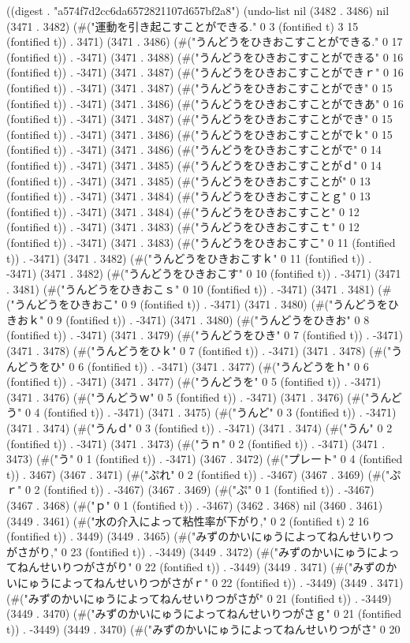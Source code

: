 
((digest . "a574f7d2cc6da6572821107d657bf2a8") (undo-list nil (3482 . 3486) nil (3471 . 3482) (#("運動を引き起こすことができる." 0 3 (fontified t) 3 15 (fontified t)) . 3471) (3471 . 3486) (#("うんどうをひきおこすことができる." 0 17 (fontified t)) . -3471) (3471 . 3488) (#("うんどうをひきおこすことができる" 0 16 (fontified t)) . -3471) (3471 . 3487) (#("うんどうをひきおこすことができｒ" 0 16 (fontified t)) . -3471) (3471 . 3487) (#("うんどうをひきおこすことができ" 0 15 (fontified t)) . -3471) (3471 . 3486) (#("うんどうをひきおこすことができあ" 0 16 (fontified t)) . -3471) (3471 . 3487) (#("うんどうをひきおこすことができ" 0 15 (fontified t)) . -3471) (3471 . 3486) (#("うんどうをひきおこすことがでｋ" 0 15 (fontified t)) . -3471) (3471 . 3486) (#("うんどうをひきおこすことがで" 0 14 (fontified t)) . -3471) (3471 . 3485) (#("うんどうをひきおこすことがｄ" 0 14 (fontified t)) . -3471) (3471 . 3485) (#("うんどうをひきおこすことが" 0 13 (fontified t)) . -3471) (3471 . 3484) (#("うんどうをひきおこすことｇ" 0 13 (fontified t)) . -3471) (3471 . 3484) (#("うんどうをひきおこすこと" 0 12 (fontified t)) . -3471) (3471 . 3483) (#("うんどうをひきおこすこｔ" 0 12 (fontified t)) . -3471) (3471 . 3483) (#("うんどうをひきおこすこ" 0 11 (fontified t)) . -3471) (3471 . 3482) (#("うんどうをひきおこすｋ" 0 11 (fontified t)) . -3471) (3471 . 3482) (#("うんどうをひきおこす" 0 10 (fontified t)) . -3471) (3471 . 3481) (#("うんどうをひきおこｓ" 0 10 (fontified t)) . -3471) (3471 . 3481) (#("うんどうをひきおこ" 0 9 (fontified t)) . -3471) (3471 . 3480) (#("うんどうをひきおｋ" 0 9 (fontified t)) . -3471) (3471 . 3480) (#("うんどうをひきお" 0 8 (fontified t)) . -3471) (3471 . 3479) (#("うんどうをひき" 0 7 (fontified t)) . -3471) (3471 . 3478) (#("うんどうをひｋ" 0 7 (fontified t)) . -3471) (3471 . 3478) (#("うんどうをひ" 0 6 (fontified t)) . -3471) (3471 . 3477) (#("うんどうをｈ" 0 6 (fontified t)) . -3471) (3471 . 3477) (#("うんどうを" 0 5 (fontified t)) . -3471) (3471 . 3476) (#("うんどうｗ" 0 5 (fontified t)) . -3471) (3471 . 3476) (#("うんどう" 0 4 (fontified t)) . -3471) (3471 . 3475) (#("うんど" 0 3 (fontified t)) . -3471) (3471 . 3474) (#("うんｄ" 0 3 (fontified t)) . -3471) (3471 . 3474) (#("うん" 0 2 (fontified t)) . -3471) (3471 . 3473) (#("うｎ" 0 2 (fontified t)) . -3471) (3471 . 3473) (#("う" 0 1 (fontified t)) . -3471) (3467 . 3472) (#("プレート" 0 4 (fontified t)) . 3467) (3467 . 3471) (#("ぷれ" 0 2 (fontified t)) . -3467) (3467 . 3469) (#("ぷｒ" 0 2 (fontified t)) . -3467) (3467 . 3469) (#("ぷ" 0 1 (fontified t)) . -3467) (3467 . 3468) (#("ｐ" 0 1 (fontified t)) . -3467) (3462 . 3468) nil (3460 . 3461) (3449 . 3461) (#("水の介入によって粘性率が下がり," 0 2 (fontified t) 2 16 (fontified t)) . 3449) (3449 . 3465) (#("みずのかいにゅうによってねんせいりつがさがり," 0 23 (fontified t)) . -3449) (3449 . 3472) (#("みずのかいにゅうによってねんせいりつがさがり" 0 22 (fontified t)) . -3449) (3449 . 3471) (#("みずのかいにゅうによってねんせいりつがさがｒ" 0 22 (fontified t)) . -3449) (3449 . 3471) (#("みずのかいにゅうによってねんせいりつがさが" 0 21 (fontified t)) . -3449) (3449 . 3470) (#("みずのかいにゅうによってねんせいりつがさｇ" 0 21 (fontified t)) . -3449) (3449 . 3470) (#("みずのかいにゅうによってねんせいりつがさ" 0 20 